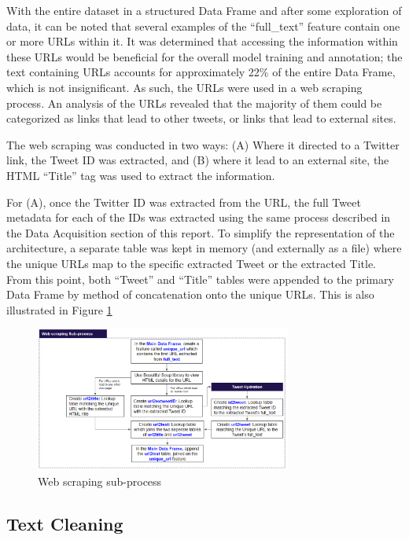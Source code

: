 \documentclass[12pt]{article}
\begin{document}
With the entire dataset in a structured Data Frame and after some exploration of data, it can be noted that several examples of the “full\_text” feature contain one or more URLs within it. It was determined that accessing the information within these URLs would be beneficial for the overall model training and annotation; the text containing URLs accounts for approximately 22\% of the entire Data Frame, which is not insignificant. As such, the URLs were used in a web scraping process. An analysis of the URLs revealed that the majority of them could be categorized as links that lead to other tweets, or links that lead to external sites. 

The web scraping was conducted in two ways: (A) Where it directed to a Twitter link, the Tweet ID was extracted, and (B) where it lead to an external site, the HTML “Title” tag was used to extract the information. 

For (A), once the Twitter ID was extracted from the URL, the full Tweet metadata for each of the IDs was extracted using the same process described in the Data Acquisition section of this report. To simplify the representation of the architecture, a separate table was kept in memory (and externally as a file) where the unique URLs map to the specific extracted Tweet or the extracted Title.  From this point, both “Tweet” and “Title” tables were appended to the primary Data Frame by method of concatenation onto the unique URLs.  This is also illustrated in Figure \ref{fig:webscraping}

\begin{figure}[tbp]
\centering 
\includegraphics[width=0.75\textwidth]{figures/webscraping}
\caption{Web scraping sub-process} 
\label{fig:webscraping}
\end{figure}

\subsection{Text Cleaning}
\end{document}
